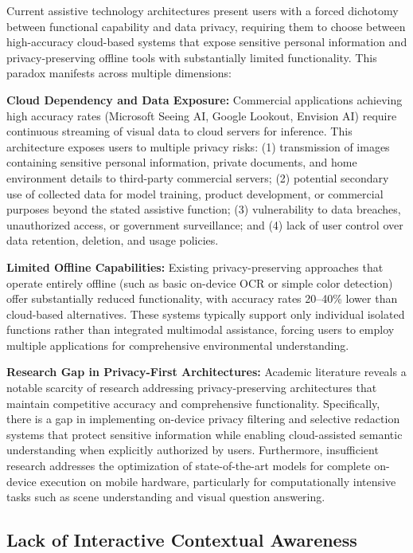 \documentclass[a4paper]{report}
\begin{document}
Current assistive technology architectures present users with a forced dichotomy between functional capability and data privacy, requiring them to choose between high-accuracy cloud-based systems that expose sensitive personal information and privacy-preserving offline tools with substantially limited functionality. This paradox manifests across multiple dimensions:

\textbf{Cloud Dependency and Data Exposure:} Commercial applications achieving high accuracy rates (Microsoft Seeing AI, Google Lookout, Envision AI) require continuous streaming of visual data to cloud servers for inference. This architecture exposes users to multiple privacy risks: (1) transmission of images containing sensitive personal information, private documents, and home environment details to third-party commercial servers; (2) potential secondary use of collected data for model training, product development, or commercial purposes beyond the stated assistive function; (3) vulnerability to data breaches, unauthorized access, or government surveillance; and (4) lack of user control over data retention, deletion, and usage policies.

\textbf{Limited Offline Capabilities:} Existing privacy-preserving approaches that operate entirely offline (such as basic on-device OCR or simple color detection) offer substantially reduced functionality, with accuracy rates 20--40\% lower than cloud-based alternatives. These systems typically support only individual isolated functions rather than integrated multimodal assistance, forcing users to employ multiple applications for comprehensive environmental understanding.

\textbf{Research Gap in Privacy-First Architectures:} Academic literature reveals a notable scarcity of research addressing privacy-preserving architectures that maintain competitive accuracy and comprehensive functionality. Specifically, there is a gap in implementing on-device privacy filtering and selective redaction systems that protect sensitive information while enabling cloud-assisted semantic understanding when explicitly authorized by users. Furthermore, insufficient research addresses the optimization of state-of-the-art models for complete on-device execution on mobile hardware, particularly for computationally intensive tasks such as scene understanding and visual question answering.

\subsection{Lack of Interactive Contextual Awareness}
\label{subsec:contextual-gap}
\end{document}
